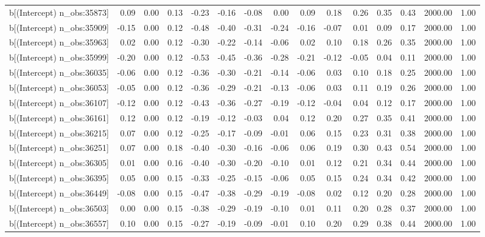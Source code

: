 \begin{table}[ht]
\begin{tabular}{rrrrrrrrrrrrrrr}
  b[(Intercept) n\_obs:35873] & 0.09 & 0.00 & 0.13 & -0.23 & -0.16 & -0.08 & 0.00 & 0.09 & 0.18 & 0.26 & 0.35 & 0.43 & 2000.00 & 1.00 \\ 
  b[(Intercept) n\_obs:35909] & -0.15 & 0.00 & 0.12 & -0.48 & -0.40 & -0.31 & -0.24 & -0.16 & -0.07 & 0.01 & 0.09 & 0.17 & 2000.00 & 1.00 \\ 
  b[(Intercept) n\_obs:35963] & 0.02 & 0.00 & 0.12 & -0.30 & -0.22 & -0.14 & -0.06 & 0.02 & 0.10 & 0.18 & 0.26 & 0.35 & 2000.00 & 1.00 \\ 
  b[(Intercept) n\_obs:35999] & -0.20 & 0.00 & 0.12 & -0.53 & -0.45 & -0.36 & -0.28 & -0.21 & -0.12 & -0.05 & 0.04 & 0.11 & 2000.00 & 1.00 \\ 
  b[(Intercept) n\_obs:36035] & -0.06 & 0.00 & 0.12 & -0.36 & -0.30 & -0.21 & -0.14 & -0.06 & 0.03 & 0.10 & 0.18 & 0.25 & 2000.00 & 1.00 \\ 
  b[(Intercept) n\_obs:36053] & -0.05 & 0.00 & 0.12 & -0.36 & -0.29 & -0.21 & -0.13 & -0.06 & 0.03 & 0.11 & 0.19 & 0.26 & 2000.00 & 1.00 \\ 
  b[(Intercept) n\_obs:36107] & -0.12 & 0.00 & 0.12 & -0.43 & -0.36 & -0.27 & -0.19 & -0.12 & -0.04 & 0.04 & 0.12 & 0.17 & 2000.00 & 1.00 \\ 
  b[(Intercept) n\_obs:36161] & 0.12 & 0.00 & 0.12 & -0.19 & -0.12 & -0.03 & 0.04 & 0.12 & 0.20 & 0.27 & 0.35 & 0.41 & 2000.00 & 1.00 \\ 
  b[(Intercept) n\_obs:36215] & 0.07 & 0.00 & 0.12 & -0.25 & -0.17 & -0.09 & -0.01 & 0.06 & 0.15 & 0.23 & 0.31 & 0.38 & 2000.00 & 1.00 \\ 
  b[(Intercept) n\_obs:36251] & 0.07 & 0.00 & 0.18 & -0.40 & -0.30 & -0.16 & -0.06 & 0.06 & 0.19 & 0.30 & 0.43 & 0.54 & 2000.00 & 1.00 \\ 
  b[(Intercept) n\_obs:36305] & 0.01 & 0.00 & 0.16 & -0.40 & -0.30 & -0.20 & -0.10 & 0.01 & 0.12 & 0.21 & 0.34 & 0.44 & 2000.00 & 1.00 \\ 
  b[(Intercept) n\_obs:36395] & 0.05 & 0.00 & 0.15 & -0.33 & -0.25 & -0.15 & -0.06 & 0.05 & 0.15 & 0.24 & 0.34 & 0.42 & 2000.00 & 1.00 \\ 
  b[(Intercept) n\_obs:36449] & -0.08 & 0.00 & 0.15 & -0.47 & -0.38 & -0.29 & -0.19 & -0.08 & 0.02 & 0.12 & 0.20 & 0.28 & 2000.00 & 1.00 \\ 
  b[(Intercept) n\_obs:36503] & 0.00 & 0.00 & 0.15 & -0.38 & -0.29 & -0.19 & -0.10 & 0.01 & 0.11 & 0.20 & 0.28 & 0.37 & 2000.00 & 1.00 \\ 
  b[(Intercept) n\_obs:36557] & 0.10 & 0.00 & 0.15 & -0.27 & -0.19 & -0.09 & -0.01 & 0.10 & 0.20 & 0.29 & 0.38 & 0.44 & 2000.00 & 1.00 \\ 

\end{tabular}
\end{table}
